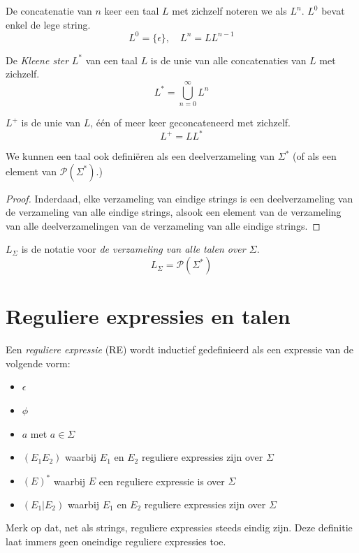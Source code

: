 \documentclass[main.tex]{subfiles}
\begin{document}
\begin{de}
  De concatenatie van $n$ keer een taal $L$ met zichzelf noteren we als $L^n$.
  $L^0$ bevat enkel de lege string.
  \[
  L^0 = \{\epsilon\},\quad L^{n} = LL^{n-1}
  \]
\end{de}

\begin{de}
  De \emph{Kleene ster} $L^*$ van een taal $L$ is de unie van alle concatenaties van $L$ met zichzelf.
  \[
  L^* = \bigcup_{n=0}^{\infty}L^n
  \]
\end{de}

\begin{de}
  $L^{+}$ is de unie van $L$, \'e\'en of meer keer geconcateneerd met zichzelf.
  \[
  L^{+} = LL^{*}
  \]
\end{de}

\begin{ei}
  \label{ei:taal-alternatieve-definitie}
  We kunnen een taal ook defini\"eren als een deelverzameling van $\Sigma^{*}$ (of als een element van $\mathcal{P}(\Sigma^{*})$.)

  \begin{proof}
    Inderdaad, elke verzameling van eindige strings is een deelverzameling van de verzameling van alle eindige strings, alsook een element van de verzameling van alle deelverzamelingen van de verzameling van alle eindige strings.
  \end{proof}
\end{ei}

\begin{de}
  $L_{\Sigma}$ is de notatie voor \emph{de verzameling van alle talen over $\Sigma$}. 
  \[ L_{\Sigma} = \mathcal{P}(\Sigma^{*}) \]
\end{de}

\section{Reguliere expressies en talen}
\label{sec:reguliere-expressies-en-talen}

\begin{de}
  Een \emph{reguliere expressie} (RE) wordt inductief gedefinieerd als een expressie van de volgende vorm:
  \begin{itemize}
  \item $\epsilon$
  \item $\phi$
  \item $a$ met $a \in \Sigma$
  \item $(E_1E_2)$ waarbij $E_1$ en $E_2$ reguliere expressies zijn over $\Sigma$
  \item $(E)^*$ waarbij $E$ een reguliere expressie is over $\Sigma$
  \item $(E_1|E_2)$ waarbij $E_1$ en $E_2$ reguliere expressies zijn over $\Sigma$
  \end{itemize}
  Merk op dat, net als strings, reguliere expressies steeds eindig zijn.
  Deze definitie laat immers geen oneindige reguliere expressies toe.
\end{de}
\end{document}
